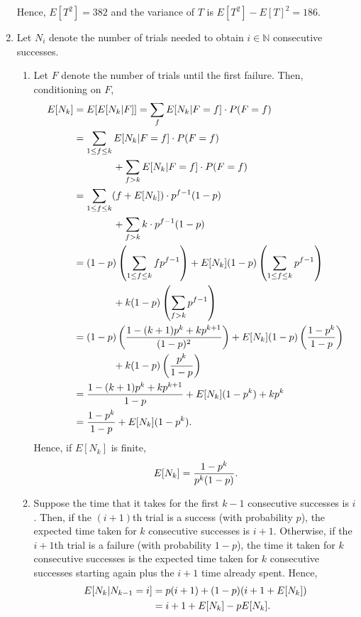 \documentclass{article}
\begin{document}
\begin{enumerate}
    Hence, $E[T^2] = 382$ and the variance of $T$ is $E[T^2] - E[T]^2 = 186$.
\item
    Let $N_i$ denote the number of trials needed to obtain $i \in \mathbb{N}$ consecutive successes.
    \begin{enumerate}
    \item
        Let $F$ denote the number of trials until the first failure. Then, conditioning on $F$,
        \[\begin{split}
        E[N_k] & = E[E[N_k|F]] = \sum_{f}E[N_k|F=f]\cdot P(F=f) \\
               & = \sum_{1 \leq f \leq k}E[N_k|F=f]\cdot P(F=f) \\
                    & \qquad\qquad + \sum_{f > k}E[N_k|F=f]\cdot P(F=f) \\
               & = \sum_{1 \leq f \leq k}(f + E[N_k])\cdot p^{f-1}(1-p) \\
                    & \qquad\qquad + \sum_{f > k}k\cdot p^{f-1}(1-p) \\
               & = (1-p) \left(\sum_{1 \leq f \leq k} fp^{f-1}\right) + E[N_k](1-p) \left(\sum_{1 \leq f \leq k}p^{f-1}\right) \\
                    & \qquad\qquad + k(1-p) \left(\sum_{f > k}p^{f-1}\right) \\
               & = (1-p) \left( \frac{1-(k+1)p^k+kp^{k+1}}{(1-p)^2} \right) + E[N_k](1-p) \left( \frac{1-p^k}{1-p} \right) \\
                    & \qquad\qquad + k(1-p) \left( \frac{p^k}{1-p} \right) \\
               & = \frac{1-(k+1)p^k + kp^{k+1}}{1-p} + E[N_k](1-p^k) + kp^k \\
               & = \frac{1-p^k}{1-p} + E[N_k](1-p^k)\text.
        \end{split}\]
        Hence, if $E[N_k]$ is finite,
        \[
        E[N_k] = \frac{1-p^k}{p^k(1-p)} \text.
        \]
    \item
        Suppose the time that it takes for the first $k-1$ consecutive successes is $i$.
        Then, if the $(i+1)$th trial is a success (with probability $p$), the expected time taken for $k$ consecutive successes is $i+1$.
        Otherwise, if the $i+1$th trial is a failure (with probability $1-p$), the time it taken for $k$ consecutive successes is the
        expected time taken for $k$ consecutive successes starting again plus the $i+1$ time already spent.
        Hence,
        \[\begin{split}
        E[N_k|N_{k-1}=i]    & = p( i+1 ) + (1-p)( i+1+E[N_k] ) \\
                            & = i + 1 + E[N_k] - pE[N_k] \text. \\
        \end{split}\]


\end{enumerate}
\end{enumerate}
\end{document}
